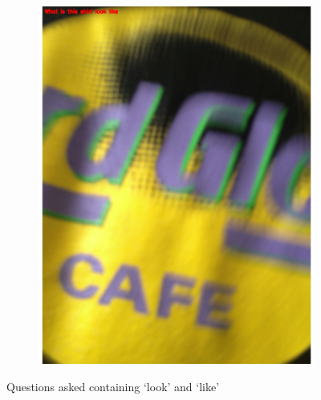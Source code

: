 \documentclass[sigconf]{acmart}
\begin{document}
\begin{figure}[hbp]
\begin{subfigure}[b]{0.45\columnwidth}
        \end{subfigure}%
        ~ 
        \begin{subfigure}[b]{0.45\columnwidth}
                \includegraphics[scale=0.3]{images/impression_2.pdf}  
        \end{subfigure}%
       
        \caption{Questions asked containing `look' and `like'} 
        \label{fig:impression}
\end{figure}
\end{document}
